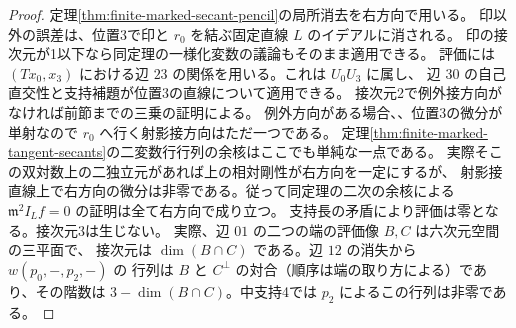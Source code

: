 \begin{proof}
定理\ref{thm:finite-marked-secant-pencil}の局所消去を右方向で用いる。
印以外の誤差は、位置3で印と $r_0$ を結ぶ固定直線 $L$ のイデアルに消される。
印の接次元が1以下なら同定理の一様化変数の議論もそのまま適用できる。
評価には $(T x_0,x_3)$ における辺 $23$ の関係を用いる。これは $U_0U_3$ に属し、
辺 $30$ の自己直交性と支持補題が位置3の直線について適用できる。
接次元2で例外接方向がなければ前節までの三乗の証明による。
例外方向がある場合、、位置3の微分が単射なので $r_0$ へ行く射影接方向はただ一つである。
定理\ref{thm:finite-marked-tangent-secants}の二変数行行列の余核はここでも単純な一点である。
実際そこの双対数上の二独立元があれば上の相対剛性が右方向を一定にするが、
射影接直線上で右方向の微分は非零である。従って同定理の二次の余核による
$\mathfrak m^2 I_L f=0$ の証明は全て右方向で成り立つ。
支持長の矛盾により評価は零となる。接次元3は生じない。
実際、辺 $01$ の二つの端の評価像 $B,C$ は六次元空間の三平面で、
接次元は $\dim(B\cap C)$ である。辺 $12$ の消失から $w(p_0,-,p_2,-)$ の
行列は $B$ と $C^\perp$ の対合（順序は端の取り方による）であり、その階数は
$3-\dim(B\cap C)$。中支持4では $p_2$ によるこの行列は非零である。
\end{proof}

